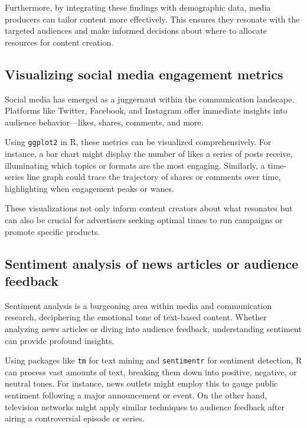 \documentclass[
  b5paper]{book}
\begin{document}
Furthermore, by integrating these findings with demographic data, media producers can tailor content more effectively. This ensures they resonate with the targeted audiences and make informed decisions about where to allocate resources for content creation.

\hypertarget{visualizing-social-media-engagement-metrics}{%
\subsection*{Visualizing social media engagement metrics}\label{visualizing-social-media-engagement-metrics}}

Social media has emerged as a juggernaut within the communication landscape. Platforms like Twitter, Facebook, and Instagram offer immediate insights into audience behavior---likes, shares, comments, and more.

Using \texttt{ggplot2} in R, these metrics can be visualized comprehensively. For instance, a bar chart might display the number of likes a series of posts receive, illuminating which topics or formats are the most engaging. Similarly, a time-series line graph could trace the trajectory of shares or comments over time, highlighting when engagement peaks or wanes.

These visualizations not only inform content creators about what resonates but can also be crucial for advertisers seeking optimal times to run campaigns or promote specific products.

\hypertarget{sentiment-analysis-of-news-articles-or-audience-feedback}{%
\subsection*{Sentiment analysis of news articles or audience feedback}\label{sentiment-analysis-of-news-articles-or-audience-feedback}}

Sentiment analysis is a burgeoning area within media and communication research, deciphering the emotional tone of text-based content. Whether analyzing news articles or diving into audience feedback, understanding sentiment can provide profound insights.

Using packages like \texttt{tm} for text mining and \texttt{sentimentr} for sentiment detection, R can process vast amounts of text, breaking them down into positive, negative, or neutral tones. For instance, news outlets might employ this to gauge public sentiment following a major announcement or event. On the other hand, television networks might apply similar techniques to audience feedback after airing a controversial episode or series.
\end{document}
